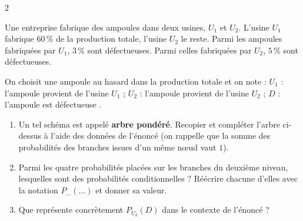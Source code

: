 \documentclass[10pt,a4paper]{article}
\begin{document}
\begin{multicols}{2}
\begin{exo}
Une entreprise fabrique des ampoules dans deux usines, \(U_1\) et \(U_2\). L'usine \(U_1\) fabrique \(60\,\%\) de la production totale, l'usine \(U_2\) le reste. Parmi les ampoules fabriquées par \(U_1\), \(3\,\%\) sont défectueuses. Parmi celles fabriquées par \(U_2\), \(5\,\%\) sont défectueuses.

On choisit une ampoule au hasard dans la production totale et on note :
\(U_1\) : \og l'ampoule provient de l'usine \(U_1\) \fg{} ; \(U_2\) : \og l'ampoule provient de l'usine \(U_2\) \fg{} ; \(D\) : \og l'ampoule est défectueuse \fg{}.

\smallskip

\begin{center}
\end{center}

\begin{enumerate}[leftmargin=*]
    \item Un tel schéma est appelé \textbf{arbre pondéré}. Recopier et compléter l'arbre ci-dessus à l'aide des données de l'énoncé (on rappelle que la somme des probabilités des branches issues d'un même nœud vaut \(1\)).
    \item Parmi les quatre probabilités placées sur les branches du deuxième niveau, lesquelles sont des probabilités conditionnelles ? Réécrire chacune d'elles avec la notation \(P_{\ldots}(\ldots)\) et donner sa valeur.
    \item Que représente concrètement \(P_{U_2}(D)\) dans le contexte de l'énoncé ?
\end{enumerate}
\end{exo}

\begin{exo}

\smallskip


\end{exo}
\end{multicols}
\end{document}
